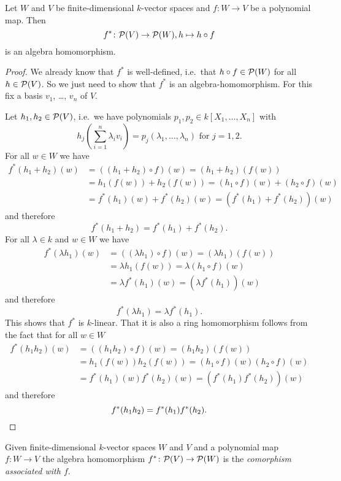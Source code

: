 \begin{lem}
 Let $W$ and $V$ be finite-dimensional $k$-vector spaces and $f \colon W \to V$ be a polynomial map. Then
 \[
  f^* \colon \mathcal{P}(V) \to \mathcal{P}(W), h \mapsto h \circ f
 \]
 is an algebra homomorphism.
\end{lem}
\begin{proof}
 We already know that $f^*$ is well-defined, i.e.\ that $h \circ f \in \mathcal{P}(W)$ for all $h \in \mathcal{P}(V)$. So we just need to show that $f^*$ is an algebra-homomorphism. For this fix a basis $v_1$, \dots, $v_n$ of $V$.
 
 Let $h_1, h_2\in \mathcal{P}(V)$, i.e.\ we have polynomials $p_1, p_2\in k[X_1, \dotsc, X_n]$ with
 \[
  h_j\left(\sum_{i=1}^n \lambda_i v_i\right) = p_j(\lambda_1, \dotsc, \lambda_n) \text{ for } j=1,2.
 \]
 For all $w \in W$ we have
 \begin{align*}
  f^*(h_1+h_2)(w)
  &= ((h_1 + h_2) \circ f)(w)
  = (h_1 + h_2)(f(w)) \\
  &= h_1(f(w)) + h_2(f(w))
  = (h_1 \circ f)(w) + (h_2 \circ f)(w) \\
  &= f^*(h_1)(w) + f^*(h_2)(w)
  = (f^*(h_1)+f^*(h_2))(w)
 \end{align*}
 and therefore
 \[
  f^*(h_1+h_2) = f^*(h_1) + f^*(h_2).
 \]
 For all $\lambda \in k$ and $w \in W$ we have
 \begin{align*}
  f^*(\lambda h_1)(w)
  &= ((\lambda h_1) \circ f)(w)
  = (\lambda h_1)(f(w)) \\
  &= \lambda h_1(f(w))
  = \lambda (h_1 \circ f)(w) \\
  &= \lambda f^*(h_1)(w)
  = (\lambda f^*(h_1))(w)
 \end{align*}
 and therefore
 \[
  f^*(\lambda h_1) = \lambda f^*(h_1).
 \]
 This shows that $f^*$ is $k$-linear. That it is also a ring homomorphism follows from the fact that for all $w \in W$
 \begin{align*}
  f^*(h_1 h_2)(w)
  &= ((h_1 h_2) \circ f)(w)
  = (h_1 h_2)(f(w)) \\
  &= h_1(f(w)) h_2(f(w))
  = (h_1 \circ f)(w) (h_2 \circ f)(w) \\
  &= f^*(h_1)(w) f^*(h_2)(w)
  = (f^*(h_1) f^*(h_2))(w)
 \end{align*}
 and therefore
 \[
  f^*(h_1 h_2) = f^*(h_1) f^*(h_2).
  \qedhere
 \]
\end{proof}


\begin{defi}
 Given finite-dimensional $k$-vector spaces $W$ and $V$ and a polynomial map $f \colon W \to V$ the algebra homomorphism $f^* \colon \mathcal{P}(V) \to \mathcal{P}(W)$ is the \emph{comorphism associated with $f$}.
\end{defi}
 

